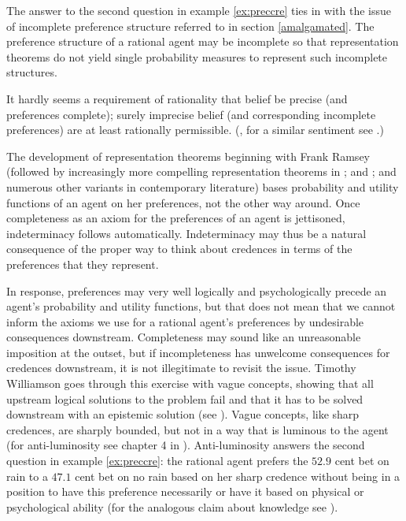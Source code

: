 \documentclass[11pt]{article}
\begin{document}
The answer to the second question in example \ref{ex:preccre} ties in
with the issue of incomplete preference structure referred to in
section \ref{amalgamated}. The preference structure of a rational
agent may be incomplete so that representation theorems do not yield
single probability measures to represent such incomplete structures.

\begin{quotex}
  It hardly seems a requirement of rationality that belief be precise
  (and preferences complete); surely imprecise belief (and
  corresponding incomplete preferences) are at least rationally
  permissible. (, for a similar sentiment
  see .)
\end{quotex}

The development of representation theorems beginning with Frank Ramsey
(followed by increasingly more compelling representation theorems in
; and ; and numerous other
variants in contemporary literature) bases probability and utility
functions of an agent on her preferences, not the other way around.
Once completeness as an axiom for the preferences of an agent is
jettisoned, indeterminacy follows automatically. Indeterminacy may
thus be a natural consequence of the proper way to think about
credences in terms of the preferences that they represent.

In response, preferences may very well logically and psychologically
precede an agent's probability and utility functions, but that does
not mean that we cannot inform the axioms we use for a rational
agent's preferences by undesirable consequences downstream.
Completeness may sound like an unreasonable imposition at the outset,
but if incompleteness has unwelcome consequences for credences
downstream, it is not illegitimate to revisit the issue. Timothy
Williamson goes through this exercise with vague concepts, showing
that all upstream logical solutions to the problem fail and that it
has to be solved downstream with an epistemic solution (see
). Vague concepts, like sharp credences, are
sharply bounded, but not in a way that is luminous to the agent (for
anti-luminosity see chapter 4 in ).
Anti-luminosity answers the second question in example
\ref{ex:preccre}: the rational agent prefers the $52.9$ cent bet on
rain to a $47.1$ cent bet on no rain based on her sharp credence
without being in a position to have this preference necessarily or
have it based on physical or psychological ability (for the analogous
claim about knowledge see ).
\end{document}
